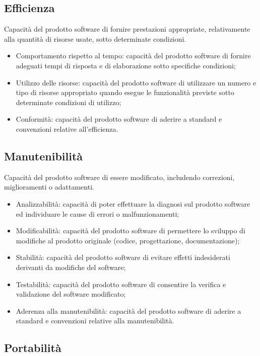 \subsection{Efficienza}
Capacità del prodotto software di fornire prestazioni appropriate, relativamente alla quantità di risorse usate, sotto determinate condizioni.

\begin{itemize}
    \item Comportamento rispetto al tempo: capacità del prodotto software di fornire adeguati tempi di risposta e di elaborazione sotto specifiche condizioni;
    \item Utilizzo delle risorse: capacità del prodotto software di utilizzare un numero e tipo di risorse appropriato quando esegue le funzionalità previste sotto determinate condizioni di utilizzo;
    \item Conformità: capacità del prodotto software di aderire a standard e convenzioni relative all'efficienza.
\end{itemize}

\subsection{Manutenibilità}
Capacità del prodotto software di essere modificato, includendo correzioni, miglioramenti o adattamenti.

\begin{itemize}
    \item Analizzabilità: capacità di poter effettuare la diagnosi sul prodotto software ed individuare le cause di errori o malfunzionamenti;
    \item Modificabilità: capacità del prodotto software di permettere lo sviluppo di modifiche al prodotto originale (codice, progettazione, documentazione);
    \item Stabilità: capacità del prodotto software di evitare effetti indesiderati derivanti da modifiche del software;
    \item Testabilità: capacità del prodotto software di consentire la verifica e validazione del software modificato;
    \item Aderenza alla manutenibilità: capacità del prodotto software di aderire a standard e convenzioni relative alla manutenibilità.
\end{itemize}

\subsection{Portabilità}

